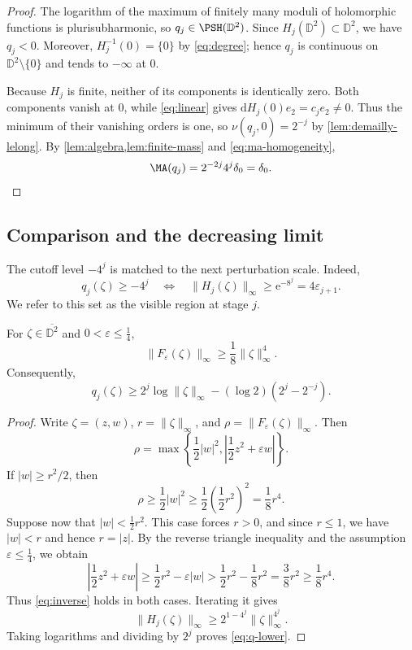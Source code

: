 \documentclass[11pt,a4paper]{article}
\newcommand{\e}{\mathrm e}
\begin{document}
\begin{proof}
The logarithm of the maximum of finitely many moduli of holomorphic functions is plurisubharmonic, so $q_j\in\PSH(\mathbb D^2)$. Since $H_j(\mathbb D^2)\subset\mathbb D^2$, we have $q_j<0$. Moreover, $H_j^{-1}(0)=\{0\}$ by \eqref{eq:degree}; hence $q_j$ is continuous on $\mathbb D^2\setminus\{0\}$ and tends to $-\infty$ at $0$.

Because $H_j$ is finite, neither of its components is identically zero. Both components vanish at $0$, while \eqref{eq:linear} gives $\mathrm dH_j(0)e_2=c_j e_2\ne0$. Thus the minimum of their vanishing orders is one, so $\nu(q_j,0)=2^{-j}$ by \cref{lem:demailly-lelong}. By \cref{lem:algebra,lem:finite-mass} and \eqref{eq:ma-homogeneity},
\[
  \MA(q_j)=2^{-2j}4^j\delta_0=\delta_0.
\]
\end{proof}

\subsection{Comparison and the decreasing limit}

The cutoff level $-4^j$ is matched to the next perturbation scale. Indeed,
\[
  q_j(\zeta)\ge-4^j \quad\Longleftrightarrow\quad\|H_j(\zeta)\|_\infty\ge\e^{-8^j}=4\varepsilon_{j+1}.
\]
We refer to this set as the visible region at stage $j$.

\begin{lemma}
For $\zeta\in\overline{\mathbb D^2}$ and $0<\varepsilon\le\frac{1}{4}$,
\begin{equation}\label{eq:inverse}
  \|F_\varepsilon(\zeta)\|_\infty \ge\frac{1}{8}\|\zeta\|_\infty^4.
\end{equation}
Consequently,
\begin{equation}\label{eq:q-lower}
  q_j(\zeta)\ge 2^j\log\|\zeta\|_\infty-(\log 2)(2^j-2^{-j}).
\end{equation}
\end{lemma}

\begin{proof}
Write $\zeta=(z,w)$, $r=\|\zeta\|_\infty$, and $\rho=\|F_\varepsilon(\zeta)\|_\infty$. Then
\[
\rho=\max\left\{ \frac{1}{2}|w|^2, \left|\frac{1}{2}z^2+\varepsilon w\right| \right\}.
\]
If $|w|\ge r^2/2$, then
\[
\rho \ge \frac{1}{2}|w|^2 \ge \frac{1}{2}\left(\frac{1}{2}r^2\right)^2=\frac{1}{8}r^4.
\]
Suppose now that $|w|<\frac{1}{2}r^2$. This case forces $r>0$, and since $r\le1$, we have $|w|<r$ and hence $r=|z|$. By the reverse triangle inequality and the assumption $\varepsilon\le\frac{1}{4}$, we obtain
\[
\left|\frac{1}{2}z^2+\varepsilon w\right|
\ge\frac{1}{2}r^2-\varepsilon|w|
>\frac{1}{2}r^2-\frac{1}{8}r^2
=\frac{3}{8}r^2
\ge\frac18r^4.
\]
Thus \eqref{eq:inverse} holds in both cases. Iterating it gives
\[
  \|H_j(\zeta)\|_\infty \ge 2^{1-4^j} \|\zeta\|_\infty^{4^j}.
\]
Taking logarithms and dividing by $2^j$ proves \eqref{eq:q-lower}.
\end{proof}
\end{document}
